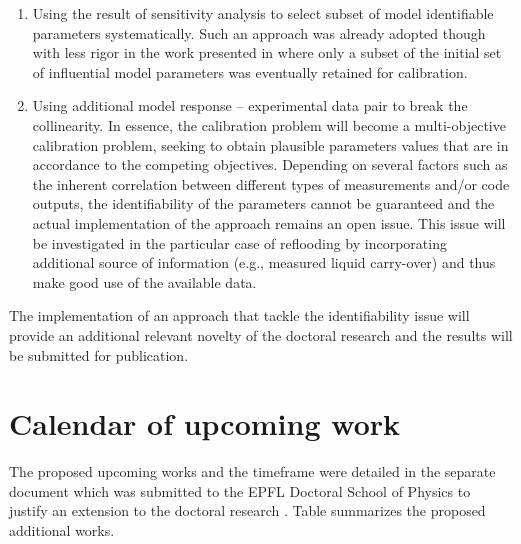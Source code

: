 \documentclass[11pt,titlepage]{article}
\begin{document}
\begin{enumerate}
    \item Using the result of sensitivity analysis to select subset of model 
    identifiable parameters systematically. 
    Such an approach was already adopted though with less rigor in the 
    work presented in \cite{Wicaksono2016} where only a subset of the 
    initial set of influential model parameters was eventually retained 
    for calibration.
    \item Using additional model response – experimental data pair to break the 
    collinearity. 
    In essence, the calibration problem will become a 
    multi-objective calibration problem, seeking to obtain plausible parameters 
    values that are in accordance to the competing objectives. 
    Depending on several factors such as the inherent correlation between 
    different types of measurements and/or code outputs, the identifiability 
    of the parameters cannot be guaranteed and the actual implementation of the 
    approach remains an open issue. This issue will be investigated in the 
    particular case of reflooding by incorporating additional source of 
    information (e.g., measured liquid carry-over) and thus make good use of 
    the available data.    
\end{enumerate}

The implementation of an approach that tackle the identifiability issue will 
provide an additional relevant novelty of the doctoral research and the 
results will be submitted for publication. 


\section{Calendar of upcoming work}

The proposed upcoming works and the timeframe were detailed in the separate 
document which was submitted to the EPFL Doctoral School of Physics to 
justify an extension to the doctoral research \cite{Wicaksono2016d}.
Table summarizes the proposed additional works.
\end{document}
